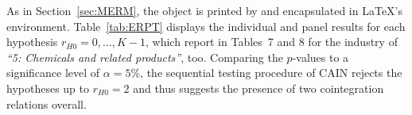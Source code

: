 \begin{table}[ht]	%
	\centering
	\caption[Cointegration rank tests]{Panel cointegration rank tests for ERPT.} 
	\resizebox{0.6\textwidth}{!}{
		}	
	\label{tab:ERPT}
\end{table}
As in Section~\ref{sec:MERM}, the  object is printed by  and encapsulated in LaTeX's  environment. Table~\ref{tab:ERPT} displays the individual and panel results for each hypothesis $ r_{H0} = 0, \ldots, K-1 $, which \citet[p.~22]{ArsovaOersal2016} report in Tables~7 and 8 for the industry of \textit{``5: Chemicals and related products''}, too. Comparing the $p$-values to a significance level of $ \alpha = 5 \% $, the sequential testing procedure of CAIN rejects the hypotheses up to $ r_{H0} = 2 $ and thus suggests the presence of two cointegration relations overall.


